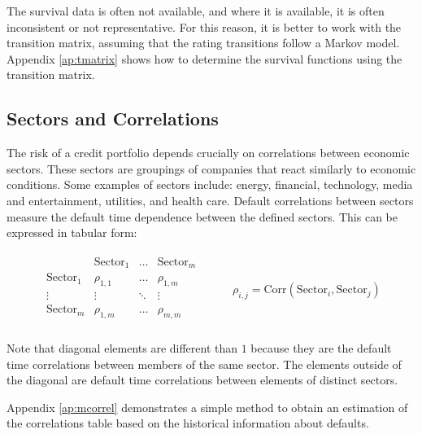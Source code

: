 \documentclass[a4paper,12pt,final]{article}
\begin{document}
The survival data is often not available, and where it is available, it is 
often inconsistent or not representative. For this reason, it is better to work 
with the transition matrix, assuming that the rating transitions follow a Markov 
model. Appendix \ref{ap:tmatrix} shows how to determine the survival functions 
using the transition matrix.

\subsection{Sectors and Correlations}
\label{sectors}
The risk of a credit portfolio depends crucially on correlations between 
economic sectors. These sectors are groupings of companies that react similarly to 
economic conditions. Some examples of sectors include: energy, financial, technology, 
media and entertainment, utilities, and health care. Default correlations between 
sectors measure the default time dependence between the defined sectors. This 
can be expressed in tabular form:

\begin{center}
\begin{displaymath}
\begin{array}{cc}
\begin{array}{c|ccc}
                    & \mathrm{Sector}_1 & \dots  & \mathrm{Sector}_{m} \\
\hline
\mathrm{Sector}_1   & \rho_{1,1}        & \dots  & \rho_{1,m} \\
\vdots              & \vdots            & \ddots & \vdots     \\
\mathrm{Sector}_{m} & \rho_{1,m}        & \dots  & \rho_{m,m} \\
\end{array}
&
\qquad \rho_{i,j} = \mathrm{Corr}(\mathrm{Sector}_i, \mathrm{Sector}_j)
\end{array}
\end{displaymath}
\end{center}

Note that diagonal elements are different than $1$ because they are the default time 
correlations between members of the same sector. The elements outside of the
diagonal are default time correlations between elements of distinct sectors.
\newline

Appendix \ref{ap:mcorrel} demonstrates a simple method to obtain an estimation of
the correlations table based on the historical information about defaults.
\end{document}
